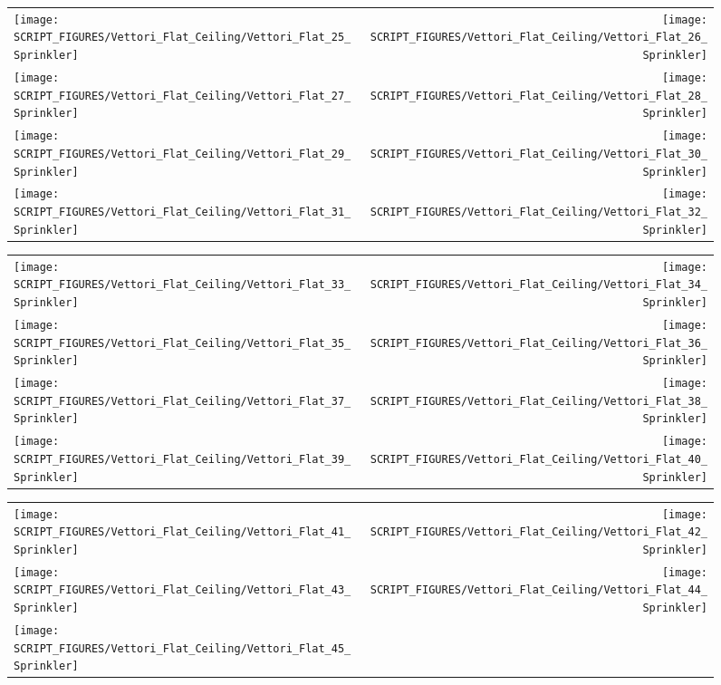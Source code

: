 \begin{figure}[p]
\begin{tabular*}{\textwidth}{l@{\extracolsep{\fill}}r}
\texttt{[image: SCRIPT\_FIGURES/Vettori\_Flat\_Ceiling/Vettori\_Flat\_25\_Sprinkler]} &
\texttt{[image: SCRIPT\_FIGURES/Vettori\_Flat\_Ceiling/Vettori\_Flat\_26\_Sprinkler]} \\
\texttt{[image: SCRIPT\_FIGURES/Vettori\_Flat\_Ceiling/Vettori\_Flat\_27\_Sprinkler]} &
\texttt{[image: SCRIPT\_FIGURES/Vettori\_Flat\_Ceiling/Vettori\_Flat\_28\_Sprinkler]} \\
\texttt{[image: SCRIPT\_FIGURES/Vettori\_Flat\_Ceiling/Vettori\_Flat\_29\_Sprinkler]} &
\texttt{[image: SCRIPT\_FIGURES/Vettori\_Flat\_Ceiling/Vettori\_Flat\_30\_Sprinkler]} \\
\texttt{[image: SCRIPT\_FIGURES/Vettori\_Flat\_Ceiling/Vettori\_Flat\_31\_Sprinkler]} &
\texttt{[image: SCRIPT\_FIGURES/Vettori\_Flat\_Ceiling/Vettori\_Flat\_32\_Sprinkler]}
\end{tabular*}
\end{figure}

\begin{figure}[p]
\begin{tabular*}{\textwidth}{l@{\extracolsep{\fill}}r}
\texttt{[image: SCRIPT\_FIGURES/Vettori\_Flat\_Ceiling/Vettori\_Flat\_33\_Sprinkler]} &
\texttt{[image: SCRIPT\_FIGURES/Vettori\_Flat\_Ceiling/Vettori\_Flat\_34\_Sprinkler]} \\
\texttt{[image: SCRIPT\_FIGURES/Vettori\_Flat\_Ceiling/Vettori\_Flat\_35\_Sprinkler]} &
\texttt{[image: SCRIPT\_FIGURES/Vettori\_Flat\_Ceiling/Vettori\_Flat\_36\_Sprinkler]} \\
\texttt{[image: SCRIPT\_FIGURES/Vettori\_Flat\_Ceiling/Vettori\_Flat\_37\_Sprinkler]} &
\texttt{[image: SCRIPT\_FIGURES/Vettori\_Flat\_Ceiling/Vettori\_Flat\_38\_Sprinkler]} \\
\texttt{[image: SCRIPT\_FIGURES/Vettori\_Flat\_Ceiling/Vettori\_Flat\_39\_Sprinkler]} &
\texttt{[image: SCRIPT\_FIGURES/Vettori\_Flat\_Ceiling/Vettori\_Flat\_40\_Sprinkler]}
\end{tabular*}
\end{figure}

\begin{figure}[p]
\begin{tabular*}{\textwidth}{l@{\extracolsep{\fill}}r}
\texttt{[image: SCRIPT\_FIGURES/Vettori\_Flat\_Ceiling/Vettori\_Flat\_41\_Sprinkler]} &
\texttt{[image: SCRIPT\_FIGURES/Vettori\_Flat\_Ceiling/Vettori\_Flat\_42\_Sprinkler]} \\
\texttt{[image: SCRIPT\_FIGURES/Vettori\_Flat\_Ceiling/Vettori\_Flat\_43\_Sprinkler]} &
\texttt{[image: SCRIPT\_FIGURES/Vettori\_Flat\_Ceiling/Vettori\_Flat\_44\_Sprinkler]} \\
\texttt{[image: SCRIPT\_FIGURES/Vettori\_Flat\_Ceiling/Vettori\_Flat\_45\_Sprinkler]}
\end{tabular*}
\end{figure}

